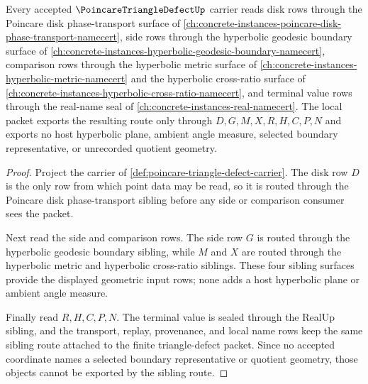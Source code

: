\begin{theorem}
\label{thm:poincare-triangle-defect-sibling-route}
Every accepted $\PoincareTriangleDefectUp$ carrier reads disk rows through the Poincare disk phase-transport surface of \autoref{ch:concrete-instances-poincare-disk-phase-transport-namecert}, side rows through the hyperbolic geodesic boundary surface of \autoref{ch:concrete-instances-hyperbolic-geodesic-boundary-namecert}, comparison rows through the hyperbolic metric surface of \autoref{ch:concrete-instances-hyperbolic-metric-namecert} and the hyperbolic cross-ratio surface of \autoref{ch:concrete-instances-hyperbolic-cross-ratio-namecert}, and terminal value rows through the real-name seal of \autoref{ch:concrete-instances-real-namecert}. The local packet exports the resulting route only through $D,G,M,X,R,H,C,P,N$ and exports no host hyperbolic plane, ambient angle measure, selected boundary representative, or unrecorded quotient geometry.
\end{theorem}
\begin{proof}
Project the carrier of \autoref{def:poincare-triangle-defect-carrier}. The disk row $D$ is the only row from which point data may be read, so it is routed through the Poincare disk phase-transport sibling before any side or comparison consumer sees the packet.

Next read the side and comparison rows. The side row $G$ is routed through the hyperbolic geodesic boundary sibling, while $M$ and $X$ are routed through the hyperbolic metric and hyperbolic cross-ratio siblings. These four sibling surfaces provide the displayed geometric input rows; none adds a host hyperbolic plane or ambient angle measure.

Finally read $R,H,C,P,N$. The terminal value is sealed through the RealUp sibling, and the transport, replay, provenance, and local name rows keep the same sibling route attached to the finite triangle-defect packet. Since no accepted coordinate names a selected boundary representative or quotient geometry, those objects cannot be exported by the sibling route.
\end{proof}




